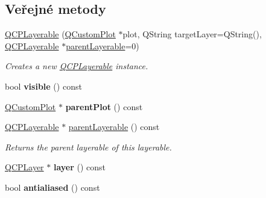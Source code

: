 \subsection*{Veřejné metody}
\begin{DoxyCompactItemize}
\item 
\hyperlink{classQCPLayerable_a74c0fa237f29bf0e49565013fc5d1ec0}{Q\+C\+P\+Layerable} (\hyperlink{classQCustomPlot}{Q\+Custom\+Plot} $\ast$plot, Q\+String target\+Layer=Q\+String(), \hyperlink{classQCPLayerable}{Q\+C\+P\+Layerable} $\ast$\hyperlink{classQCPLayerable_a98d79f5b716d45eac4347befe546d0ec}{parent\+Layerable}=0)
\begin{DoxyCompactList}\small\item\em Creates a new \hyperlink{classQCPLayerable}{Q\+C\+P\+Layerable} instance. \end{DoxyCompactList}\item 
\hypertarget{classQCPLayerable_a10a3cc92e0fa63e4a929e61d34e275a7}{}bool {\bfseries visible} () const \label{classQCPLayerable_a10a3cc92e0fa63e4a929e61d34e275a7}

\item 
\hypertarget{classQCPLayerable_ab7e0e94461566093d36ffc0f5312b109}{}\hyperlink{classQCustomPlot}{Q\+Custom\+Plot} $\ast$ {\bfseries parent\+Plot} () const \label{classQCPLayerable_ab7e0e94461566093d36ffc0f5312b109}

\item 
\hyperlink{classQCPLayerable}{Q\+C\+P\+Layerable} $\ast$ \hyperlink{classQCPLayerable_a98d79f5b716d45eac4347befe546d0ec}{parent\+Layerable} () const 
\begin{DoxyCompactList}\small\item\em Returns the parent layerable of this layerable. \end{DoxyCompactList}\item 
\hypertarget{classQCPLayerable_aea67e8c19145e70d68c286a36f6b8300}{}\hyperlink{classQCPLayer}{Q\+C\+P\+Layer} $\ast$ {\bfseries layer} () const \label{classQCPLayerable_aea67e8c19145e70d68c286a36f6b8300}

\item 
\hypertarget{classQCPLayerable_aef5cb4aa899ed9dc9384fd614560291e}{}bool {\bfseries antialiased} () const \label{classQCPLayerable_aef5cb4aa899ed9dc9384fd614560291e}


\end{DoxyCompactItemize}
